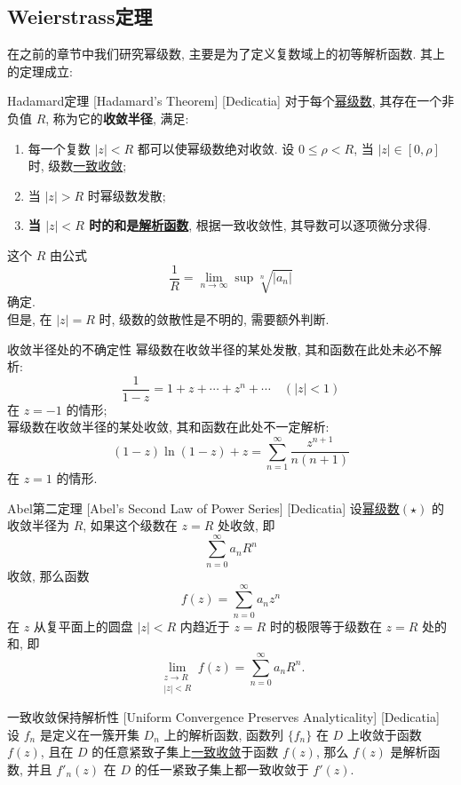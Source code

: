 \documentclass[UTF8]{ctexart}
\newcommand{\AnalyticalFunction}{\hyperref[dfn:AnalyticalFunction]{解析函数}}
\newcommand{\PowerSeries}{\hyperref[dfn:PowerSeries]{幂级数}}
\newcommand{\UniformConvergence}{\hyperref[dfn:UniformConvergence]{一致收敛}}
\begin{document}
\subsection{Weierstrass定理}
在之前的章节中我们研究幂级数, 主要是为了定义复数域上的初等解析函数. 其上的定理成立: 
\begin{thm}
    [UUID]
    {Hadamard定理}
    [Hadamard's Theorem]
    [Dedicatia]
    对于每个\PowerSeries, 其存在一个非负值 \( R \), 称为它的\textbf{收敛半径}, 满足: 
    \begin{enumerate}
        \item 每一个复数 \( |z|<R \) 都可以使幂级数绝对收敛. 设 \( 0\leqslant\rho <R \), 当 \( |z|\in[0,\rho] \) 时, 级数\UniformConvergence; 
        \item 当 \( |z|>R \) 时幂级数发散; 
        \item \textbf{当 \( |z|<R \) 时的和是\AnalyticalFunction }, 根据一致收敛性, 其导数可以逐项微分求得. 
    \end{enumerate}
    这个 \( R \) 由公式
    \[\frac{1}{R}=\lim_{n\to \infty}\sup\sqrt[n]{|a_n|}\]
    确定. \\
    但是, 在 \( |z|=R \) 时, 级数的敛散性是不明的, 需要额外判断. 
\end{thm}
\begin{cxmp}
    {收敛半径处的不确定性}
    幂级数在收敛半径的某处发散, 其和函数在此处未必不解析: 
    \[\frac{1}{1-z}=1+z+\cdots+z^n+\cdots\quad(|z|<1) \]
    在 \( z=-1 \) 的情形; \\
    幂级数在收敛半径的某处收敛, 其和函数在此处不一定解析: 
    \[(1-z)\ln(1-z)+z=\sum_{n=1}^{\infty}\frac{z^{n+1}}{n(n+1)}\]
    在 \( z=1 \) 的情形. 
\end{cxmp}
\begin{thm}
    [UUID]
    {Abel第二定理}
    [Abel's Second Law of Power Series]
    [Dedicatia]
    设\PowerSeries  \( (\star) \) 的收敛半径为 \( R \), 如果这个级数在 \( z = R \) 处收敛, 即
    \[\sum_{n=0}^{\infty} a_n R^n\]
    收敛, 那么函数
    \[f(z) = \sum_{n=0}^{\infty} a_n z^n\]
    在 \( z \) 从复平面上的圆盘 \( |z| < R \) 内趋近于 \( z = R \) 时的极限等于级数在 \( z = R \) 处的和, 即
    \[\lim_{\substack{z \to R \\ |z| < R}} f(z) = \sum_{n=0}^{\infty} a_n R^n.\]
\end{thm}
\begin{thm}
    [UUID]
    {一致收敛保持解析性}
    [Uniform Convergence Preserves Analyticality]
    [Dedicatia]
    设 \( f_n \) 是定义在一簇开集 \( D_n \) 上的解析函数, 函数列 \( \{f_n\} \) 在 \( D \) 上收敛于函数 \( f(z) \), 且在 \( D \) 的任意紧致子集上\UniformConvergence 于函数 \( f(z) \), 那么 \( f(z) \) 是解析函数, 并且 \( f'_n(z) \) 在 \( D \) 的任一紧致子集上都一致收敛于 \( f'(z) \).
\end{thm}
\end{document}
